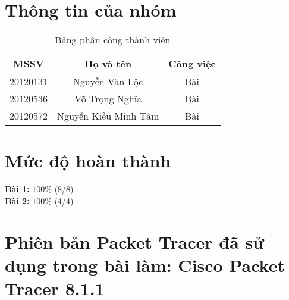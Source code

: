 \section{Thông tin của nhóm}
\begin{table}[H]
\begin{center}
\begin{tabular}{|c|c|c|}
\hline 
MSSV & Họ và tên & Công việc \\ 
\hline 
20120131 & Nguyễn Văn Lộc & Bài  \\ 
\hline 
20120536 & Võ Trọng Nghĩa & Bài \\ 
\hline 
20120572 & Nguyễn Kiều Minh Tâm & Bài \\ 
\hline 
\end{tabular}
\caption{Bảng phân công thành viên} 
\end{center}
\end{table}

\section{Mức độ hoàn thành}
\textbf{Bài 1:} $100\%$ (8/8)\\
\textbf{Bài 2:} $100\%$ (4/4)\\

\section{Phiên bản Packet Tracer đã sử dụng trong bài làm: Cisco Packet Tracer 8.1.1}

